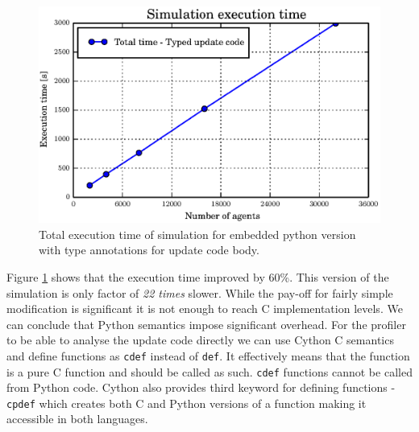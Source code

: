 \documentclass[12pt, a4paper]{report}
\begin{document}
\begin{figure}[H]
  \begin{center}
    \includegraphics[width=\columnwidth]{graphs/cython-typed-perf.eps}
    \caption{Total execution time of simulation for embedded python version with type
    annotations for update code body.}
    \label{fig:cython-typed-perf}
  \end{center}
\end{figure}

Figure \ref{fig:cython-typed-perf} shows that the execution time improved by 60\%.
This version of the simulation is only factor of \emph{22 times} slower.
While the pay-off for fairly simple modification is significant it is not enough
to reach C implementation levels.
We can conclude that Python semantics impose significant overhead.
For the profiler to be able to analyse the update code directly we can use Cython
C semantics and define functions as \lstinline{cdef} instead of \lstinline{def}.
It effectively means that the function is a pure C function and should be called
as such. \lstinline{cdef} functions cannot be called from Python code.
Cython also provides third keyword for defining functions - \lstinline{cpdef}
which creates both C and Python versions of a function making it accessible in both
languages.
\end{document}
